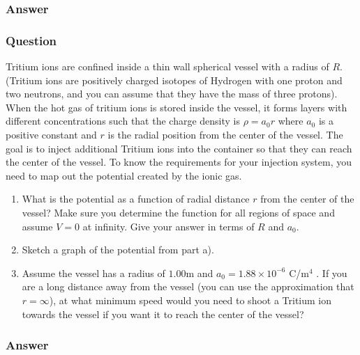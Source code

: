 \subsubsection{Answer}



\subsubsection{Question}
Tritium ions are confined inside a thin wall spherical vessel with a radius of $R$. (Tritium ions are positively charged isotopes of Hydrogen with one proton and two neutrons, and you can assume that they have the mass of three protons). When the hot gas of tritium ions is stored inside the vessel, it forms layers with different concentrations such that the charge density is ${\rho} = a_0 r$ where $a_0$ is a positive constant and $r$ is the radial position from the center of the vessel. The goal is to inject additional Tritium ions into the container so that they can reach the center of the vessel. To know the requirements for your injection system, you need to map out the potential created by the ionic gas.
\begin{enumerate}
	\item What is the potential as a function of radial distance $r$ from the center of the vessel? Make sure you determine the function for all regions of space and assume $V = 0$ at infinity. Give your answer in terms of $R$ and $a_0$.
	\item Sketch a graph of the potential from part a).
	\item Assume the vessel has a radius of $1.00$m and $a_0 = 1.88 {\times} 10^{-6}$ C/m$^4$ . If you are a long distance away from the vessel (you can use the approximation that $r = {\infty}$), at what minimum speed would you need to shoot a Tritium ion towards the vessel if you want it to reach the center of the vessel?
\end{enumerate}
\subsubsection{Answer}



